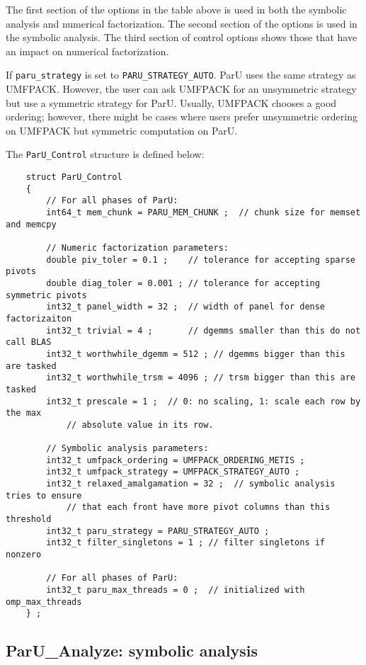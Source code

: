 \documentclass[12pt]{article}
\begin{document}
    The first section of the options in the table above is used in both the
    symbolic analysis and numerical factorization.  The second section of the
    options is used in the symbolic analysis.  The third section of control options
    shows those that have an impact on numerical factorization.

    If \verb'paru_strategy' is set to \verb'PARU_STRATEGY_AUTO'.  ParU uses the
    same strategy as UMFPACK. However, the user can ask UMFPACK for an
    unsymmetric strategy but use a symmetric strategy for ParU. Usually,
    UMFPACK chooses a good ordering; however, there might be cases where users
    prefer unsymmetric ordering on UMFPACK but symmetric computation on ParU.

    The \verb'ParU_Control' structure is defined below:

    {\footnotesize
    \begin{verbatim}
    struct ParU_Control
    {
        // For all phases of ParU:
        int64_t mem_chunk = PARU_MEM_CHUNK ;  // chunk size for memset and memcpy

        // Numeric factorization parameters:
        double piv_toler = 0.1 ;    // tolerance for accepting sparse pivots
        double diag_toler = 0.001 ; // tolerance for accepting symmetric pivots
        int32_t panel_width = 32 ;  // width of panel for dense factorizaiton
        int32_t trivial = 4 ;       // dgemms smaller than this do not call BLAS
        int32_t worthwhile_dgemm = 512 ; // dgemms bigger than this are tasked
        int32_t worthwhile_trsm = 4096 ; // trsm bigger than this are tasked
        int32_t prescale = 1 ;  // 0: no scaling, 1: scale each row by the max
            // absolute value in its row.

        // Symbolic analysis parameters:
        int32_t umfpack_ordering = UMFPACK_ORDERING_METIS ;
        int32_t umfpack_strategy = UMFPACK_STRATEGY_AUTO ;
        int32_t relaxed_amalgamation = 32 ;  // symbolic analysis tries to ensure
            // that each front have more pivot columns than this threshold
        int32_t paru_strategy = PARU_STRATEGY_AUTO ;
        int32_t filter_singletons = 1 ; // filter singletons if nonzero

        // For all phases of ParU:
        int32_t paru_max_threads = 0 ;  // initialized with omp_max_threads
    } ; \end{verbatim}}

\subsection{{\sf ParU\_Analyze}: symbolic analysis}
\end{document}

